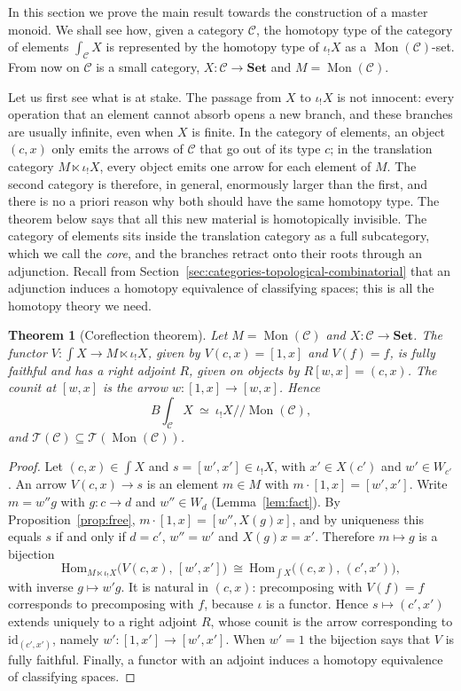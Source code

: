 \documentclass[11pt]{amsart}
\newtheorem{theorem}[teo]{Theorem}
\theoremstyle{definition}
\theoremstyle{remark}
\numberwithin{figure}{section}%
\newcommand{\CC}{\mathcal{C}}
\DeclareMathOperator{\Mon}{Mon}
\newcommand{\C}{\mathcal{C}}
\newcommand{\T}{\mathcal{T}}
\newcommand{\Set}{\mathbf{Set}}
\newcommand{\Hom}{\mathrm{Hom}}
\begin{document}
In this section we prove the main result towards the construction of a master monoid. We shall see how, given a category $\CC$, the homotopy type of the category of elements $\int_{\CC}X$ is represented by the homotopy type of $\iota_!X$ as a $\Mon(\CC)$-set. From now on $\CC$ is a small category, $X\colon\CC\to\Set$ and $M=\Mon(\CC)$.

Let us first see what is at stake. The passage from $X$ to $\iota_!X$ is not innocent: every operation that an element cannot absorb opens a new branch, and these branches are usually infinite, even when $X$ is finite. In the category of elements, an object $(c,x)$ only emits the arrows of $\CC$ that go out of its type $c$; in the translation category $M\ltimes\iota_!X$, every object emits one arrow for each element of $M$. The second category is therefore, in general, enormously larger than the first, and there is no a priori reason why both should have the same homotopy type. The theorem below says that all this new material is homotopically invisible. The category of elements sits inside the translation category as a full subcategory, which we call the \emph{core}, and the branches retract onto their roots through an adjunction. Recall from Section~\ref{sec:categories-topological-combinatorial} that an adjunction induces a homotopy equivalence of classifying spaces; this is all the homotopy theory we need.

\begin{theorem}[Coreflection theorem]\label{thm:B}
Let $M=\Mon(\C)$ and $X\colon\C\to\Set$. The functor $V\colon\int X\to M\ltimes\iota_!X$, given by $V(c,x)=[1,x]$ and $V(f)=f$, is fully faithful and has a right adjoint $R$, given on objects by $R[w,x]=(c,x)$. The counit at $[w,x]$ is the arrow $w\colon[1,x]\to[w,x]$. Hence
\[
B\!\textstyle\int_\C X\ \simeq\ \iota_!X/\!/\Mon(\C),
\]
and $\T(\C)\subseteq\T(\Mon(\C))$.
\end{theorem}

\begin{proof}
Let $(c,x)\in\int X$ and $s=[w',x']\in\iota_!X$, with $x'\in X(c')$ and $w'\in W_{c'}$. An arrow $V(c,x)\to s$ is an element $m\in M$ with $m\cdot[1,x]=[w',x']$. Write $m=w''g$ with $g\colon c\to d$ and $w''\in W_d$ (Lemma~\ref{lem:fact}). By Proposition~\ref{prop:free}, $m\cdot[1,x]=[w'',X(g)x]$, and by uniqueness this equals $s$ if and only if $d=c'$, $w''=w'$ and $X(g)x=x'$. Therefore $m\mapsto g$ is a bijection
\[
\Hom_{M\ltimes\iota_!X}\big(V(c,x),\,[w',x']\big)\ \cong\ \Hom_{\int X}\big((c,x),\,(c',x')\big),
\]
with inverse $g\mapsto w'g$. It is natural in $(c,x)$: precomposing with $V(f)=f$ corresponds to precomposing with $f$, because $\iota$ is a functor. Hence $s\mapsto(c',x')$ extends uniquely to a right adjoint $R$, whose counit is the arrow corresponding to $\mathrm{id}_{(c',x')}$, namely $w'\colon[1,x']\to[w',x']$. When $w'=1$ the bijection says that $V$ is fully faithful. Finally, a functor with an adjoint induces a homotopy equivalence of classifying spaces.
\end{proof}
\end{document}

